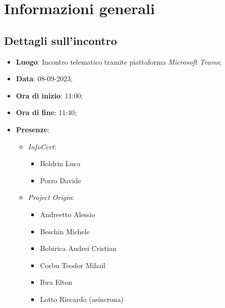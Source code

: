 \section{Informazioni generali}

\subsection{Dettagli sull'incontro}
\begin{itemize}
\item \textbf{Luogo}: Incontro telematico tramite piattaforma \textit{Microsoft Teams\glo};
\item \textbf{Data}: 08-09-2023;
\item \textbf{Ora di inizio}: 11:00;
\item \textbf{Ora di fine}: 11:40;
\item \textbf{Presenze}: 
\begin{itemize}
    \item \textit{InfoCert}: \begin{itemize}
            \item Boldrin Luca
            \item Porro Davide 
        \end{itemize}  
    \item \textit{Project Origin}:  \begin{itemize}
        \item Andreetto Alessio
        \item Beschin Michele
        \item Bobirica Andrei Cristian 
        \item Corbu Teodor Mihail
        \item Ibra Elton
        \item Lotto Riccardo (asincrona)
    \end{itemize}	
\end{itemize}
\end{itemize}



